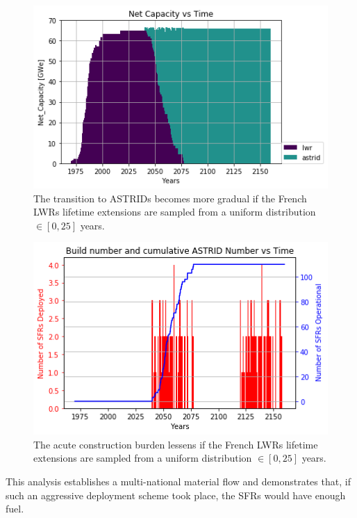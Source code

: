 \begin{figure}[htbp!]
	\begin{center}
		\includegraphics[scale=0.7]{./images/french-transition/unif_0_25.png}
	\end{center}
	\caption{The transition to \glspl{ASTRID}
		becomes more gradual if the
		French \glspl{LWR} lifetime extensions are sampled from a 
		uniform distribution $\in [0, 25]$ years.}
	\label{fig:sfr_num_norm}
\end{figure}

\begin{figure}[htbp!]
	\begin{center}
		\includegraphics[scale=0.7]{./images/french-transition/unif_0_25_dep.png}
	\end{center}
	\caption{The acute construction burden lessens if the
		French \glspl{LWR} lifetime extensions are sampled from a 
		uniform distribution $\in [0, 25]$ years.}
	\label{fig:sfr_dep_norm}
\end{figure}

\FloatBarrier

This analysis establishes a multi-national material flow and demonstrates that, if such an aggressive deployment scheme took place, the \glspl{SFR} would have enough fuel.

